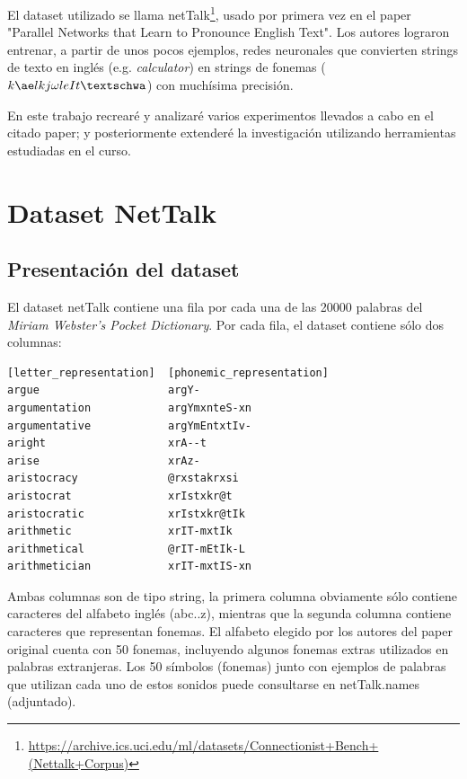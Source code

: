 \documentclass[paper=a4, fontsize=11pt]{scrartcl} %
\numberwithin{equation}{section} %
\numberwithin{figure}{section} %
\numberwithin{table}{section} %
\begin{document}
\par El dataset utilizado se llama netTalk\footnote{\url{https://archive.ics.uci.edu/ml/datasets/Connectionist+Bench+(Nettalk+Corpus)}}, usado por primera vez en el paper  "Parallel Networks that Learn to Pronounce English Text"\cite{parallel}. Los autores lograron entrenar, a partir de unos pocos ejemplos, redes neuronales que convierten strings de texto en inglés (e.g. \textit{calculator}) en strings de fonemas ( $k \ae lkj \omega leIt  \textschwa $) con muchísima precisión.\\
    

\par En este trabajo recrearé y analizaré varios experimentos llevados a cabo en el citado paper; y posteriormente extenderé la investigación utilizando herramientas estudiadas en el curso.

\section{Dataset NetTalk}

\subsection{Presentación del dataset}
El dataset netTalk contiene una fila por cada una de las 20000 palabras del \textit{Miriam Webster’s Pocket Dictionary}. Por cada fila, el dataset contiene sólo dos columnas: \\

\begin{center}

\begin{BVerbatim}
[letter_representation]  [phonemic_representation]
argue                    argY-   
argumentation            argYmxnteS-xn   
argumentative            argYmEntxtIv-   
aright                   xrA--t   
arise                    xrAz-   
aristocracy              @rxstakrxsi   
aristocrat               xrIstxkr@t   
aristocratic             xrIstxkr@tIk   
arithmetic               xrIT-mxtIk   
arithmetical             @rIT-mEtIk-L   
arithmetician            xrIT-mxtIS-xn   
\end{BVerbatim}

\end{center}

Ambas columnas son de tipo string, la primera columna obviamente sólo contiene caracteres del alfabeto inglés (abc..z), mientras que la segunda columna contiene caracteres que representan fonemas. El alfabeto elegido por los autores del paper original cuenta con 50 fonemas, incluyendo algunos fonemas extras utilizados en palabras extranjeras. Los 50 símbolos (fonemas) junto con ejemplos de palabras que utilizan cada uno de estos sonidos puede consultarse en netTalk.names (adjuntado).\\
\end{document}
